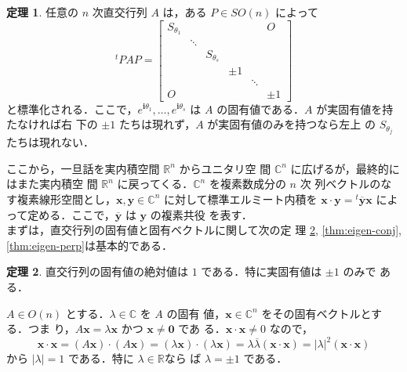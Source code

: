 \documentclass[11pt, uplatex, dvipdfmx, titlepage]{jsarticle}
\makeatletter
\renewcommand{\i}{\mathbf{i}}
\renewcommand{\bar}[1]{\overline{#1}}
\renewenvironment{proof}[1][\proofname]{\par
  \pushQED{\qed}%
  \normalfont \topsep6\p@\@plus6\p@\relax
  \trivlist
  \item[\hskip\labelsep
         \bfseries
    {#1}]\ignorespaces
}{%
  \popQED\endtrivlist\@endpefalse
}
\theoremstyle{definition}
\newtheorem{theorem}{定理}[section]
\renewcommand{\proofname}{\textbf{証明}}
\makeatother
\begin{document}
  \begin{theorem}\label{thm:stdform}
    任意の $n$ 次直交行列 $A$ は，ある $P \in SO(n)$ によって 
    \begin{equation}\label{eq:std}
      {}^{t}PAP = \left[
        \begin{array}{cccccc}
          S_{\theta_1} & & & & & O\\
                       & \ddots & & & & \\
                       & & S_{\theta_s} & & &\\
                       & & & \pm 1 & &\\
                       & & & & \ddots &\\
          O & & & & & \pm 1
        \end{array}
      \right]
    \end{equation}
    と標準化される．ここで，$e^{\i \theta_1}, \ldots,
    e^{\i\theta_s}$ は $A$ の固有値である．$A$ が実固有値を持たなければ右
    下の $\pm 1$ たちは現れず，$A$ が実固有値のみを持つなら左上
    の $S_{\theta_j}$ たちは現れない．
  \end{theorem}

  ここから，一旦話を実内積空間 $\mathbb{R}^n$ からユニタリ空
  間 $\mathbb{C}^n$ に広げるが，最終的にはまた実内積空
  間 $\mathbb{R}^n$ に戻ってくる．$\mathbb{C}^n$ を複素数成分の $n$ 次
  列ベクトルのなす複素線形空間とし，$\bm{x}, \bm{y} \in \mathbb{C}^n$
  に対して標準エルミート内積を $\bm{x}\cdot  \bm{y} = {}^{t} \bar{\bm{y}}
  \bm{x}$ によって定める．ここで，$\bar{\bm{y}}$ は $\bm{y}$ の複素共役
  を表す．\\

  まずは，直交行列の固有値と固有ベクトルに関して次の定
  理 \ref{thm:eigenvalue}, \ref{thm:eigen-conj}, \ref{thm:eigen-perp}は基本的である．
  
\begin{theorem}\label{thm:eigenvalue}
  直交行列の固有値の絶対値は $1$ である．特に実固有値は $\pm 1$ のみで
  ある．
\end{theorem}

\begin{proof}
  $A \in O(n)$ とする．$\lambda \in \mathbb{C}$ を $A$ の固有
  値，$\bm{x} \in \mathbb{C}^n$ をその固有ベクトルとする．つま
  り，$A\bm{x} = \lambda \bm{x}$ かつ $\bm{x} \neq \bm{0}$ であ
  る．$\bm{x}\cdot  \bm{x} \neq 0$ なので，
  \[
    \bm{x}\cdot  \bm{x} = (A\bm{x})\cdot (A\bm{x}) = (\lambda \bm{x})\cdot (\lambda
    \bm{x}) = \lambda \bar{\lambda} (\bm{x}\cdot  \bm{x}) = |\lambda|^2
    (\bm{x}\cdot  \bm{x})
  \]
  から $|\lambda|=1$ である．特に $\lambda \in \mathbb{R}$なら
  ば $\lambda= \pm 1$ である．
\end{proof}
\end{document}
